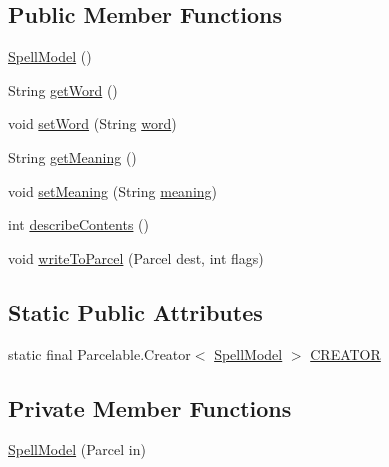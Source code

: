 \subsection*{Public Member Functions}
\begin{DoxyCompactItemize}
\item 
\hyperlink{classorg_1_1buildmlearn_1_1learnspellings_1_1data_1_1SpellModel_a9e266b1f4548b4c1f8e7ffc7d15dd06a}{Spell\+Model} ()
\item 
String \hyperlink{classorg_1_1buildmlearn_1_1learnspellings_1_1data_1_1SpellModel_a36b9f993d22e827f7b0a216500331302}{get\+Word} ()
\item 
void \hyperlink{classorg_1_1buildmlearn_1_1learnspellings_1_1data_1_1SpellModel_ab403ad0757386018b671ee7532ca5133}{set\+Word} (String \hyperlink{classorg_1_1buildmlearn_1_1learnspellings_1_1data_1_1SpellModel_a1de777e680f4faa84afb63255ebcbe98}{word})
\item 
String \hyperlink{classorg_1_1buildmlearn_1_1learnspellings_1_1data_1_1SpellModel_a6b3189149c1da8ffa466f6cb8885b5c4}{get\+Meaning} ()
\item 
void \hyperlink{classorg_1_1buildmlearn_1_1learnspellings_1_1data_1_1SpellModel_a700f870cf39a4d409215f3e0c933ed94}{set\+Meaning} (String \hyperlink{classorg_1_1buildmlearn_1_1learnspellings_1_1data_1_1SpellModel_a5869ecb2ab5a4ffc9f3ff0944ad40f0b}{meaning})
\item 
int \hyperlink{classorg_1_1buildmlearn_1_1learnspellings_1_1data_1_1SpellModel_a4595d9d52de658d46355c5963a8381b4}{describe\+Contents} ()
\item 
void \hyperlink{classorg_1_1buildmlearn_1_1learnspellings_1_1data_1_1SpellModel_acb9ed81fb5d857fa571042ba3f40999a}{write\+To\+Parcel} (Parcel dest, int flags)
\end{DoxyCompactItemize}
\subsection*{Static Public Attributes}
\begin{DoxyCompactItemize}
\item 
static final Parcelable.\+Creator$<$ \hyperlink{classorg_1_1buildmlearn_1_1learnspellings_1_1data_1_1SpellModel}{Spell\+Model} $>$ \hyperlink{classorg_1_1buildmlearn_1_1learnspellings_1_1data_1_1SpellModel_a0e3f2ccfa761be30db7cadf658095cef}{C\+R\+E\+A\+T\+OR}
\end{DoxyCompactItemize}
\subsection*{Private Member Functions}
\begin{DoxyCompactItemize}
\item 
\hyperlink{classorg_1_1buildmlearn_1_1learnspellings_1_1data_1_1SpellModel_a1c3b726d7210b79feec9e0a00559a7f0}{Spell\+Model} (Parcel in)
\end{DoxyCompactItemize}
